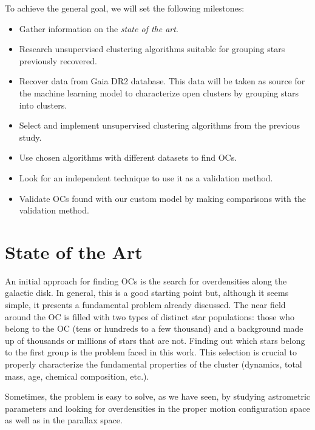 \documentclass[11pt, a4paper, english]{book}
\begin{document}
To achieve the general goal, we will set the following milestones:

\begin{itemize}
  \item Gather information on the \emph{state of the art}.
  \item Research unsupervised clustering algorithms suitable for grouping stars previously recovered.
  \item Recover data from Gaia DR2 database. This data will be taken as source for the machine learning model to characterize open clusters
  by grouping stars into clusters.
  \item Select and implement unsupervised clustering algorithms from the previous study.
  \item Use chosen algorithms with different datasets to find OCs.
  \item Look for an independent technique to use it as a validation method.
  \item Validate OCs found with our custom model by making comparisons with the validation method.
\end{itemize}

\chapter{State of the Art}

An initial approach for finding OCs is the search for overdensities along the galactic disk.
In general, this is a good starting point but, although it seems simple,
it presents a fundamental problem already discussed.
The near field around the OC is filled with two types of distinct star populations:
those who belong to the OC (tens or hundreds to a few thousand)
and a background made up of thousands or millions of stars that are not.
Finding out which stars belong to the first group is the problem faced in this work.
This selection is crucial to properly characterize the fundamental properties of the cluster
(dynamics, total mass, age, chemical composition, etc.).

Sometimes, the problem is easy to solve, as we have seen, by studying astrometric parameters
and looking for overdensities in the proper motion configuration space as well as in the parallax space.
\end{document}
